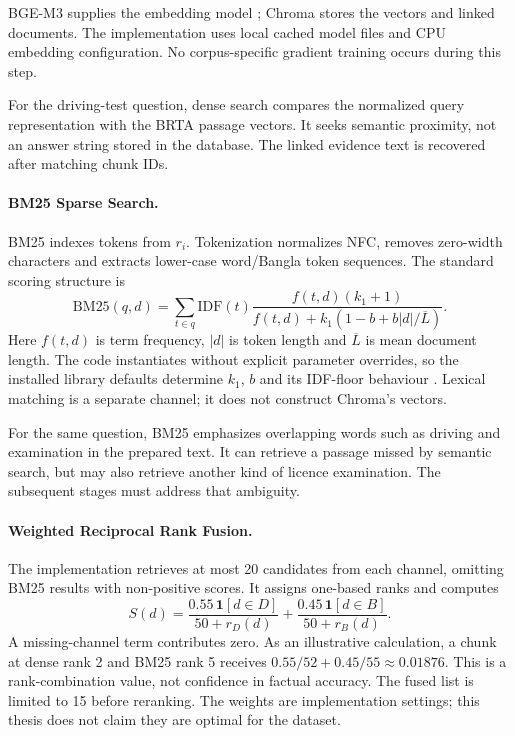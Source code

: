 BGE-M3 supplies the embedding model \cite{bgem3}; Chroma stores the vectors and linked documents. The implementation uses local cached model files and CPU embedding configuration. No corpus-specific gradient training occurs during this step.

For the driving-test question, dense search compares the normalized query representation with the BRTA passage vectors. It seeks semantic proximity, not an answer string stored in the database. The linked evidence text is recovered after matching chunk IDs.

\paragraph{BM25 Sparse Search.}
BM25 indexes tokens from $r_i$. Tokenization normalizes NFC, removes zero-width characters and extracts lower-case word/Bangla token sequences. The standard scoring structure is
\begin{equation}
\mathrm{BM25}(q,d)=\sum_{t\in q}\mathrm{IDF}(t)
\frac{f(t,d)(k_1+1)}{f(t,d)+k_1(1-b+b|d|/\overline L)}.
\end{equation}
Here $f(t,d)$ is term frequency, $|d|$ is token length and $\overline L$ is mean document length. The code instantiates  without explicit parameter overrides, so the installed library defaults determine $k_1$, $b$ and its IDF-floor behaviour \cite{bm25}. Lexical matching is a separate channel; it does not construct Chroma's vectors.

For the same question, BM25 emphasizes overlapping words such as driving and examination in the prepared text. It can retrieve a passage missed by semantic search, but may also retrieve another kind of licence examination. The subsequent stages must address that ambiguity.

\paragraph{Weighted Reciprocal Rank Fusion.}
The implementation retrieves at most 20 candidates from each channel, omitting BM25 results with non-positive scores. It assigns one-based ranks and computes
\begin{equation}
S(d)=\frac{0.55\,\mathbf{1}[d\in D]}{50+r_D(d)}+
\frac{0.45\,\mathbf{1}[d\in B]}{50+r_B(d)}.
\end{equation}
A missing-channel term contributes zero. As an illustrative calculation, a chunk at dense rank 2 and BM25 rank 5 receives $0.55/52+0.45/55\approx0.01876$. This is a rank-combination value, not confidence in factual accuracy. The fused list is limited to 15 before reranking. The weights are implementation settings; this thesis does not claim they are optimal for the dataset.

